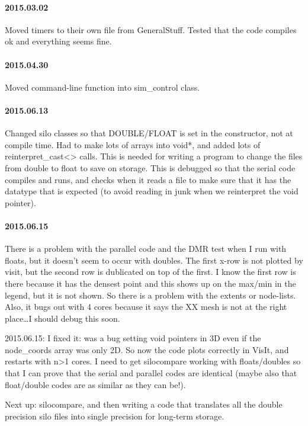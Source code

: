 \documentclass[a4paper,11pt]{article}
\begin{document}
\paragraph{2015.03.02}
Moved timers to their own file from GeneralStuff.
Tested that the code compiles ok and everything seems fine.

\paragraph{2015.04.30}
Moved command-line function into sim\_control class.

\paragraph{2015.06.13}
Changed silo classes so that DOUBLE/FLOAT is set in the constructor, not at compile time.
Had to make lots of arrays into void*, and added lots of reinterpret\_cast<> calls.
This is needed for writing a program to change the files from double to float to save on storage.
This is debugged so that the serial code compiles and runs, and checks when it reads a file to make sure that it has the datatype that is expected (to avoid reading in junk when we reinterpret the void pointer).


\paragraph{2015.06.15}
There is a problem with the parallel code and the DMR test when I run with floats, but it doesn't seem to occur with doubles.  The first x-row is not plotted by visit, but the second row is dublicated on top of the first.
I know the first row is there because it has the densest point and this shows up on the max/min in the legend, but it is not shown.
So there is a problem with the extents or node-lists.
Also, it bugs out with 4 cores because it says the XX mesh is not at the right place\ldots I should debug this soon.

2015.06.15: I fixed it: was a bug setting void pointers in 3D even if the node\_coords array was only 2D.
So now the code plots correctly in VisIt, and restarts with n>1 cores.
I need to get silocompare working with floats/doubles so that I can prove that the serial and parallel codes are identical (maybe also that float/double codes are as similar as they can be!).

Next up: silocompare, and then writing a code that translates all the double precision silo files into single precision for long-term storage.
\end{document}
